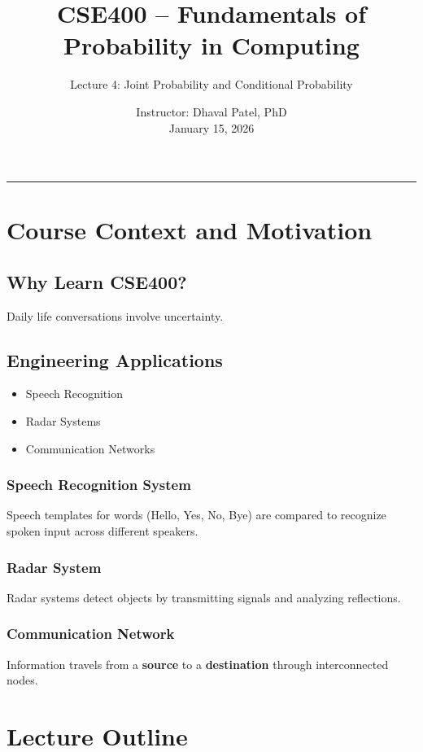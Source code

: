 \documentclass[12pt]{article}
\title{\textbf{CSE400 -- Fundamentals of Probability in Computing}}
\author{Lecture 4: Joint Probability and Conditional Probability}
\date{Instructor: Dhaval Patel, PhD \\ January 15, 2026}
\begin{document}
\maketitle
\hrule
\vspace{0.5cm}


\section{Course Context and Motivation}

\subsection{Why Learn CSE400?}
Daily life conversations involve uncertainty.

\subsection{Engineering Applications}
\begin{itemize}
\item Speech Recognition
\item Radar Systems
\item Communication Networks
\end{itemize}

\subsubsection*{Speech Recognition System}
Speech templates for words (Hello, Yes, No, Bye) are compared to recognize spoken input across different speakers.

\subsubsection*{Radar System}
Radar systems detect objects by transmitting signals and analyzing reflections.

\subsubsection*{Communication Network}
Information travels from a \textbf{source} to a \textbf{destination} through interconnected nodes.


\section{Lecture Outline}
\end{document}
